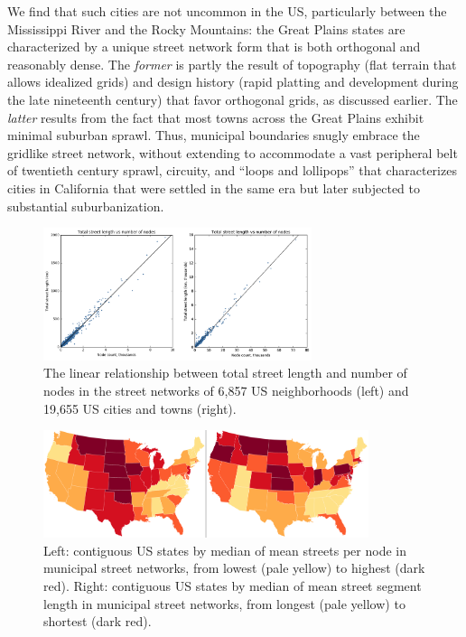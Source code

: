 \documentclass{article}
\begin{document}
We find that such cities are not uncommon in the US, particularly between the Mississippi River and the Rocky Mountains: the Great Plains states are characterized by a unique street network form that is both orthogonal and reasonably dense. The \emph{former} is partly the result of topography (flat terrain that allows idealized grids) and design history (rapid platting and development during the late nineteenth century) that favor orthogonal grids, as discussed earlier. The \emph{latter} results from the fact that most towns across the Great Plains exhibit minimal suburban sprawl. Thus, municipal boundaries snugly embrace the gridlike street network, without extending to accommodate a vast peripheral belt of twentieth century sprawl, circuity, and \enquote{loops and lollipops} \cite{southworth_streets_1997} that characterizes cities in California that were settled in the same era but later subjected to substantial suburbanization.

\begin{figure}
	\includegraphics[width=0.7\textwidth]{media/fig03.png}
	\caption{The linear relationship between total street length and number of nodes in the street networks of 6,857 US neighborhoods (left) and 19,655 US cities and towns (right).}
	\label{fig03}
\end{figure}

\begin{figure}
	\includegraphics[width=0.85\textwidth]{media/fig04.png}
	\caption{Left: contiguous US states by median of mean streets per node in municipal street networks, from lowest (pale yellow) to highest (dark red). Right: contiguous US states by median of mean street segment length in municipal street networks, from longest (pale yellow) to shortest (dark red).}
	\label{fig04}
\end{figure}
\end{document}
